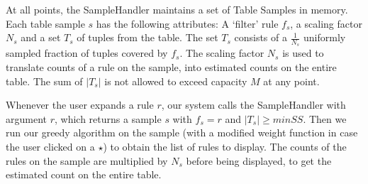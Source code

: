 \documentclass{sig-alternate}
\begin{document}
At all points, the SampleHandler maintains a set of Table Samples in memory. Each table sample $s$ has the following attributes: A `filter' rule $f_s$, a scaling factor $N_s$ and a set $T_s$ of tuples from the table. The set $T_s$ consists of a $\frac{1}{N_s}$ uniformly sampled fraction of tuples covered by $f_s$. The scaling factor $N_s$ is used to translate counts of a rule on the sample, into estimated counts on the entire table. The sum of $|T_s|$ is not allowed to exceed capacity $M$ at any point. 

Whenever the user expands a rule $r$, our system calls the SampleHandler with argument $r$, which returns a sample $s$ with $f_s = r$ and $|T_s| \geq minSS$. Then we run our greedy algorithm on the sample (with a modified weight function in case the user clicked on a $\star$) to obtain the list of rules to display. The counts of the rules on the sample are multiplied by $N_s$ before being displayed, to get the estimated count on the entire table. 
\end{document}

